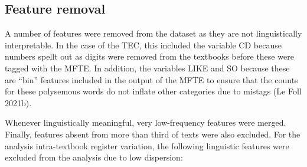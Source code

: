 \documentclass[
  letterpaper,
  DIV=11,
  numbers=noendperiod]{scrreprt}
\begin{document}
\subsection{Feature removal}\label{feature-removal}

A number of features were removed from the dataset as they are not
linguistically interpretable. In the case of the TEC, this included the
variable CD because numbers spellt out as digits were removed from the
textbooks before these were tagged with the MFTE. In addition, the
variables LIKE and SO because these are ``bin'' features included in the
output of the MFTE to ensure that the counts for these polysemous words
do not inflate other categories due to mistags (Le Foll 2021b).

Whenever linguistically meaningful, very low-frequency features were
merged. Finally, features absent from more than third of texts were also
excluded. For the analysis intra-textbook register variation, the
following linguistic features were excluded from the analysis due to low
dispersion:
\end{document}

